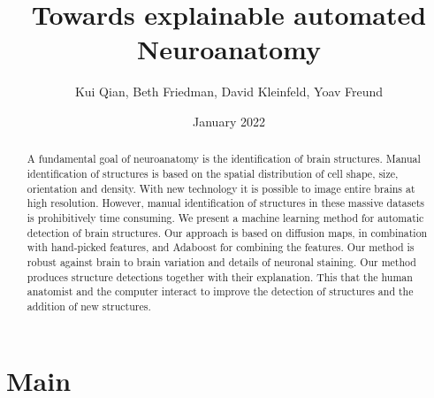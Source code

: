 \documentclass[runningheads]{llncs}
\title{Towards explainable automated Neuroanatomy}
\author{Kui Qian, Beth Friedman, David Kleinfeld, Yoav Freund}
\date{January 2022}
\begin{document}
\maketitle

\begin{abstract}
  A fundamental goal of neuroanatomy is the identification of brain
  structures.  Manual identification of structures is based on the
  spatial distribution of cell shape, size, orientation and density.
  With new technology it is possible to image entire brains at high
  resolution.  However, manual identification of structures in these
  massive datasets is prohibitively time consuming.  We present a
  machine learning method for automatic detection of brain structures. Our approach is based on diffusion maps, in combination with hand-picked features, and Adaboost for combining the features. Our method is robust against brain to brain variation and details of neuronal staining.
  Our method produces structure detections together with their explanation. This  that the human anatomist and the computer interact to improve the detection of structures and the addition of new structures.
  
\end{abstract}

\section{Main}
\end{document}
